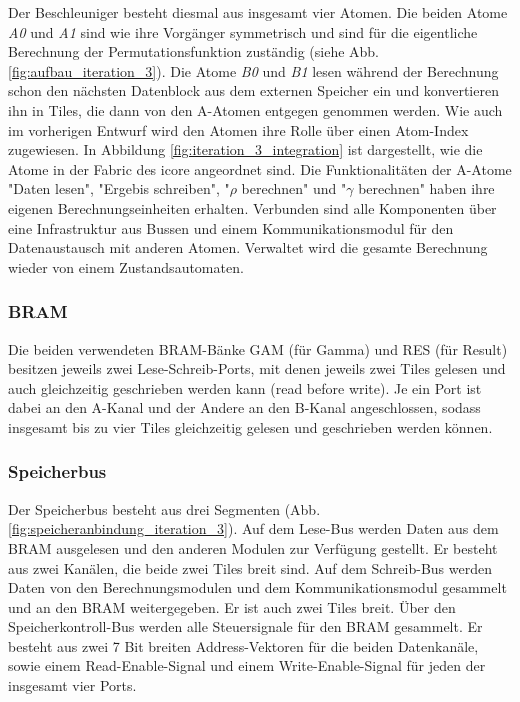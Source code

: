 Der Beschleuniger besteht diesmal aus insgesamt vier Atomen. Die beiden Atome \textit{A0} und \textit{A1} sind wie ihre Vorgänger symmetrisch und
sind für die eigentliche Berechnung der Permutationsfunktion zuständig (siehe Abb. \ref{fig:aufbau_iteration_3}). Die Atome \textit{B0} und \textit{B1} lesen während der Berechnung schon
den nächsten Datenblock aus dem externen Speicher ein und konvertieren ihn in Tiles, die dann von den A-Atomen entgegen genommen werden.
Wie auch im vorherigen Entwurf wird den Atomen ihre Rolle über einen Atom-Index zugewiesen. In Abbildung \ref{fig:iteration_3_integration}
ist dargestellt, wie die Atome in der Fabric des icore angeordnet sind. Die Funktionalitäten der A-Atome "Daten lesen", "Ergebis schreiben",
"$\rho$ berechnen" und "$\gamma$ berechnen" haben ihre eigenen Berechnungseinheiten erhalten. Verbunden sind alle Komponenten über eine Infrastruktur
aus Bussen und einem Kommunikationsmodul für den Datenaustausch mit anderen Atomen. Verwaltet wird die gesamte Berechnung wieder von einem Zustandsautomaten.

\subsubsection{BRAM}
Die beiden verwendeten BRAM-Bänke GAM (für Gamma) und RES (für Result) besitzen jeweils zwei Lese-Schreib-Ports, mit denen jeweils zwei Tiles
gelesen und auch gleichzeitig geschrieben werden kann (read before write). Je ein Port ist dabei an den A-Kanal und der Andere an den B-Kanal angeschlossen,
sodass insgesamt bis zu vier Tiles gleichzeitig gelesen und geschrieben werden können. 

\subsubsection{Speicherbus}
Der Speicherbus besteht aus drei Segmenten (Abb. \ref{fig:speicheranbindung_iteration_3}). Auf dem Lese-Bus werden Daten aus dem BRAM ausgelesen und den anderen Modulen zur Verfügung gestellt.
Er besteht aus zwei Kanälen, die beide zwei Tiles breit sind.
Auf dem Schreib-Bus werden Daten von den Berechnungsmodulen und dem Kommunikationsmodul gesammelt und an den BRAM weitergegeben.
Er ist auch zwei Tiles breit. Über den Speicherkontroll-Bus werden alle Steuersignale für den BRAM gesammelt.
Er besteht aus zwei 7 Bit breiten Address-Vektoren für die beiden Datenkanäle, sowie einem Read-Enable-Signal
und einem Write-Enable-Signal für jeden der insgesamt vier Ports.

